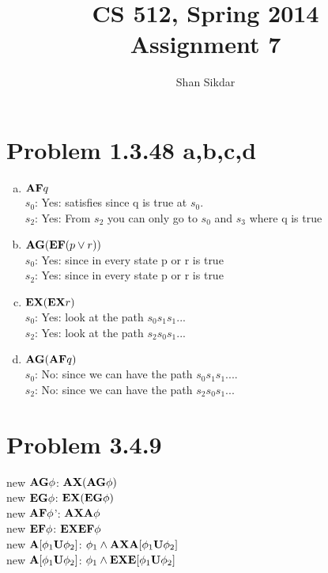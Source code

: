 \documentclass[11pt,leqno,fleqn]{article}
\title{CS 512, Spring 2014
       \\[1ex]
       \textbf{Assignment 7}}
\author{Shan Sikdar}
\date{} %
\newcommand{\tab}{\hspace*{2em}}
\begin{document}
\maketitle

\section{Problem 1.3.48 a,b,c,d}
\begin{enumerate}[(a)]
\item  $\bold{AF}q$\\
$s_0$: Yes: satisfies since q is true at $s_0$.\\
$s_2$: Yes: From $s_2$ you can only go to $s_0$ and $s_3$ where q is true
\item $\bold{AG}(\bold{EF}(p \lor r))$\\
$s_0$: Yes: since in every  state p or r is true\\
$s_2$: Yes: since in every state p or r is true
\item $\bold{EX}(\bold{EX}r)$\\
$s_0$: Yes: look at the path $s_0 s_1 s_1...$\\
$s_2$: Yes: look at the path $s_2 s_0 s_1...$
\item $\bold{AG}(\bold{AF}q)$\\
$s_0$: No: since we can have the path $s_0 s_1 s_1....$\\
$s_2$: No: since we can have the path $s_2 s_0 s_1...$
\end{enumerate}

\newpage
\section{Problem 3.4.9}
new $\bold{AG} \phi$: \tab $\bold{AX}(\bold{AG} \phi)$\\
new $\bold{EG} \phi$: \tab $\bold{EX}(\bold{EG}\phi)$\\
new $\bold{AF} \phi$': \tab$\bold{AXA}\phi$\\
new $\bold{EF} \phi$: \tab$\bold{EXEF}\phi$\\
new $\bold{A}[\phi_1 \bold{U} \phi_2]$: \tab $\phi_1 \land \bold{AXA}[\phi_1 \bold{U} \phi_2]$\\
new $\bold{A}[\phi_1 \bold{U} \phi_2]$: \tab $\phi_1 \land \bold{EXE}[\phi_1 \bold{U} \phi_2]$
\end{document}
